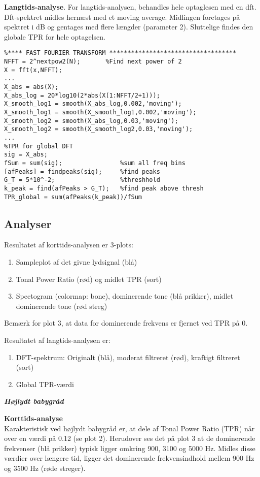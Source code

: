 \textbf{Langtids-analyse}. For langtids-analysen, behandles hele optaglesen med en dft. Dft-spektret midles hernæst med et moving average. Midlingen foretages på spektret i dB og gentages med flere længder (parameter 2). Sluttelige findes den globale TPR for hele optagelsen. 

\begin{verbatim}%**** FAST FOURIER TRANSFORM *********************************** 
NFFT = 2^nextpow2(N);       %Find next power of 2
X = fft(x,NFFT);
...
X_abs = abs(X);
X_abs_log = 20*log10(2*abs(X(1:NFFT/2+1)));
X_smooth_log1 = smooth(X_abs_log,0.002,'moving');
X_smooth_log1 = smooth(X_smooth_log1,0.002,'moving'); 
X_smooth_log2 = smooth(X_abs_log,0.03,'moving');       
X_smooth_log2 = smooth(X_smooth_log2,0.03,'moving');
...
%TPR for global DFT
sig = X_abs;
fSum = sum(sig);                %sum all freq bins
[afPeaks] = findpeaks(sig);     %find peaks
G_T = 5*10^-2;                  %threshhold
k_peak = find(afPeaks > G_T);   %find peak above thresh
TPR_global = sum(afPeaks(k_peak))/fSum 
\end{verbatim}

\newpage
\subsection{Analyser}
Resultatet af korttids-analysen er 3-plots:
\begin{enumerate}
	\item Sampleplot af det givne lydsignal (blå)
	\item Tonal Power Ratio (rød) og midlet TPR (sort)
	\item Spectogram (colormap: bone), dominerende tone (blå prikker), midlet dominerende tone (rød streg)
\end{enumerate}
Bemærk for plot 3, at data for dominerende frekvens er fjernet ved TPR på 0.

Resultatet af langtids-analysen er:
\begin{enumerate}
	\item DFT-spektrum: Originalt (blå), moderat filtreret (rød), kraftigt filtreret (sort)
	\item Global TPR-værdi
\end{enumerate}

\newpage
\begin{center}  \textit{\textbf{Højlydt babygråd}}  \end{center}
\textbf{Korttids-analyse} \\
Karakteristisk ved højlydt babygråd er, at dele af Tonal Power Ratio (TPR) når over en værdi på 0.12 (se plot 2). Herudover ses det på plot 3 at de dominerende frekvenser (blå prikker) typisk ligger omkring 900, 3100 og 5000 Hz. Midles disse værdier over længere tid, ligger det dominerende frekvensindhold mellem 900 Hz og 3500 Hz (røde streger). 

